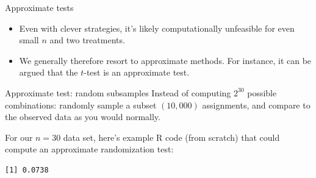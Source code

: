 \begin{frame}{Approximate tests}
  \begin{itemize}
    \item Even with clever strategies, it's likely computationally unfeasible for even small $n$ and two treatments.
    \item We generally therefore resort to approximate methods. For instance, it can be argued that the $t$-test is an approximate test.
  \end{itemize}
  
  \begin{block}{Approximate test: random subsamples}
    Instead of computing $2^{30}$ possible combinations: randomly sample a subset $(10,000)$ assignments, and compare to the observed data as you would normally.
  \end{block}
  
  \framebreak
  
  For our $n = 30$ data set, here's example R code (from scratch) that could compute an approximate randomization test:




\begin{knitrout}\small
{}\color{fgcolor}\begin{kframe}
\begin{alltt}
\hldef{(}\hldef{)}
 \hlkwb{<-} 
 \hlkwb{<-} \hldef{(}\hldef{, \{}
   \hlkwb{<-} \hldef{(}\hldef{(}\hldef{,} \hlopt{-}\hldef{),}  \hldef{=} \hldef{,}  \hldef{=} \hldef{)}
   \hlopt{*} 
\hldef{\})}

 \hlopt{>} 
\end{alltt}
\begin{verbatim}
[1] 0.0738
\end{verbatim}
\end{kframe}
\end{knitrout}




  

\end{frame}

